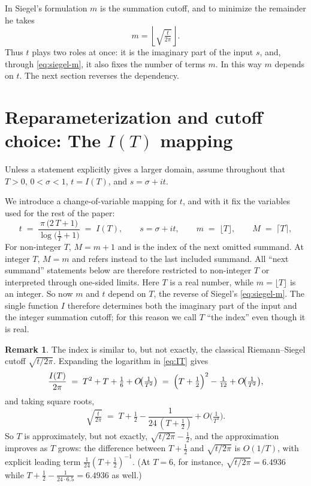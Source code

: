 \documentclass[11pt]{article}
\theoremstyle{definition}
\newtheorem{remark}[theorem]{Remark}
\begin{document}
In Siegel's formulation $m$ is the summation cutoff, and to minimize the
remainder he takes
\begin{equation}\label{eq:siegel-m}
m=\left\lfloor\sqrt{\tfrac{t}{2\pi}}\right\rfloor .
\end{equation}
Thus $t$ plays two roles at once: it is the imaginary part of the input $s$,
and, through \eqref{eq:siegel-m}, it also fixes the number of terms $m$. In
this way $m$ depends on $t$. The next section reverses the dependency.

\section{Reparameterization and cutoff choice: The \texorpdfstring{$I(T)$}{I(T)} mapping}\label{sec:IT}

Unless a statement explicitly gives a larger domain, assume throughout that
$T>0$, $0<\sigma<1$, $t=I(T)$, and $s=\sigma+it$.

We introduce a change-of-variable mapping for $t$, and with it fix the
variables used for the rest of the paper:
\begin{equation}\label{eq:IT}
t
\;=\;
\frac{\pi\,\bigl(2\,T + 1\bigr)}{\log\!\bigl(\tfrac{1}{T} + 1\bigr)}
\;=\; I(T),
\qquad
s=\sigma+it,
\qquad
m \;=\; \lfloor T\rfloor,
\qquad
M \;=\; \lceil T\rceil,
\end{equation}
For non-integer $T$, $M=m+1$ and is the index of the next omitted summand.
At integer $T$, $M=m$ and refers instead to the last included summand. All
``next summand'' statements below are therefore restricted to non-integer
$T$ or interpreted through one-sided limits.
Here $T$ is a real number, while $m=\lfloor T\rfloor$ is an integer. So now
$m$ and $t$ depend on $T$, the reverse of Siegel's \eqref{eq:siegel-m}. The single
function $I$ therefore determines both the imaginary part of the input and the
integer summation cutoff; for this reason we call $T$ ``the index'' even
though it is real.

\begin{remark}\label{rem:T-vs-a}
The index is similar to, but not exactly, the classical
Riemann--Siegel cutoff $\sqrt{t/2\pi}$. Expanding the logarithm
in \eqref{eq:IT} gives
\[
\frac{I(T)}{2\pi}
\;=\;T^{2}+T+\tfrac16+O\!\bigl(\tfrac1{T^{2}}\bigr)
\;=\;\Bigl(T+\tfrac12\Bigr)^{2}-\tfrac1{12}+O\!\bigl(\tfrac1{T^{2}}\bigr),
\]
and taking square roots,
\[
\sqrt{\tfrac t{2\pi}}
\;=\;T+\tfrac12-\frac{1}{24\,(T+\tfrac12)}+O\!\bigl(\tfrac1{T^{3}}\bigr).
\]
So $T$ is approximately, but not exactly, $\sqrt{t/2\pi}-\tfrac12$, and
the approximation improves as $T$ grows: the difference between $T+\tfrac12$ and
$\sqrt{t/2\pi}$ is $O(1/T)$, with explicit leading term
$\tfrac1{24}(T+\tfrac12)^{-1}$. (At $T=6$, for instance,
$\sqrt{t/2\pi}=6.4936$ while $T+\tfrac12-\tfrac1{24\cdot6.5}=6.4936$ as
well.)
\end{remark}
\end{document}
